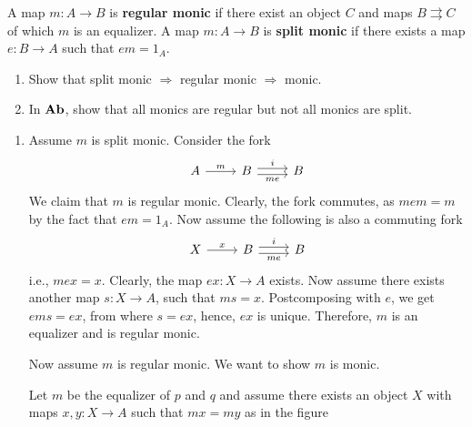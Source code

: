 \documentclass[11pt,a4paper]{article}
\begin{document}
\begin{exercise}
    A map $m:A\to B$ is \textbf{regular monic} if there exist an object $C$ and maps $B\rightrightarrows C$ of which $m$ is an equalizer. A map $m:A\to B$ is \textbf{split monic} if there exists a map $e:B\to A$ such that $em=1_A$.
    \begin{enumerate}[label=(\alph*)]
        \item Show that split monic $\Rightarrow$ regular monic $\Rightarrow$ monic.
        \item In $\mathbf{Ab}$, show that all monics are regular but not all monics are split.
    \end{enumerate}
\end{exercise}
\begin{solution}\leavevmode
    \begin{enumerate}[label=(\alph*)]
        \item Assume $m$ is split monic. Consider the fork
            \begin{equation*}
            \begin{tikzcd}
                A \arrow[r, "m"] & B \arrow[r, shift left, "i"] \arrow[r, shift right, "me"'] & B
            \end{tikzcd}
            \end{equation*}
            We claim that $m$ is regular monic. Clearly, the fork commutes, as $mem = m$ by the fact that $em=1_A$. Now assume the following is also a commuting fork
            \begin{equation*}
            \begin{tikzcd}
                X \arrow[r, "x"] & B \arrow[r, shift left, "i"] \arrow[r, shift right, "me"'] & B
            \end{tikzcd}
            \end{equation*}
            i.e., $mex=x$. Clearly, the map $ex: X\to A$ exists. Now assume there exists another map $s:X\to A$, such that $ms=x$. Postcomposing with $e$, we get $ems=ex$, from where $s=ex$, hence, $ex$ is unique. Therefore, $m$ is an equalizer and is regular monic.\par
            Now assume $m$ is regular monic. We want to show $m$ is monic.\par
            Let $m$ be the equalizer of $p$ and $q$ and assume there exists an object $X$ with maps $x,y: X\to A$ such that $mx=my$ as in the figure
            \begin{equation*}
            \begin{tikzcd}

\end{tikzcd}
\end{equation*}
\end{enumerate}
\end{solution}
\end{document}
